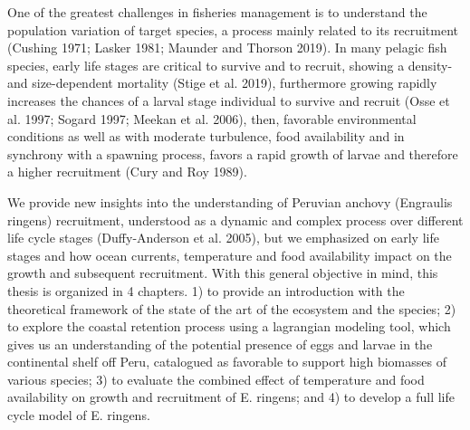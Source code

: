 One of the greatest challenges in fisheries management is to understand the population variation of target species, a process mainly related to its recruitment (Cushing 1971; Lasker 1981; Maunder and Thorson 2019). In many pelagic fish species, early life stages are critical to survive and to recruit, showing a density- and size-dependent mortality (Stige et al. 2019), furthermore growing rapidly increases the chances of a larval stage individual to survive and recruit (Osse et al. 1997; Sogard 1997; Meekan et al. 2006), then, favorable environmental conditions as well as with moderate turbulence, food availability and in synchrony with a spawning process, favors a rapid growth of larvae and therefore a higher recruitment (Cury and Roy 1989).

We provide new insights into the understanding of Peruvian anchovy (Engraulis ringens) recruitment, understood as a dynamic and complex process over different life cycle stages (Duffy-Anderson et al. 2005), but we emphasized on early life stages and how ocean currents, temperature and food availability impact on the growth and subsequent recruitment.
With this general objective in mind, this thesis is organized in 4 chapters. 1) to provide an introduction with the theoretical framework of the state of the art of the ecosystem and the species; 2) to explore the coastal retention process using a lagrangian modeling tool, which gives us an understanding of the potential presence of eggs and larvae in the continental shelf off Peru, catalogued as favorable to support high biomasses of various species; 3) to evaluate the combined effect of temperature and food availability on growth and recruitment of E. ringens; and 4) to develop a full life cycle model of E. ringens. 